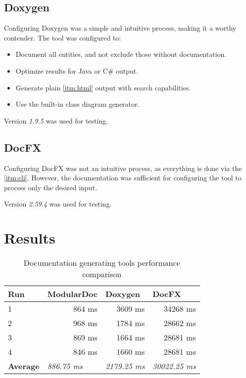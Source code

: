 \subsection{Doxygen}

Configuring Doxygen was a simple and intuitive process, making it a worthy contender. The tool was configured to:
\begin{itemize}
    \item Document all entities, and not exclude those without documentation.
    \item Optimize results for Java or C\# output.
    \item Generate plain \ref{itm:html} output with search capabilities.
    \item Use the built-in class diagram generator.
\end{itemize}

Version \textit{1.9.5} was used for testing.

\subsection{DocFX}

Configuring DocFX was not an intuitive process, as everything is done via the \ref{itm:cli}. However, the documentation was sufficient for configuring the tool to process only the desired input.

Version \textit{2.59.4} was used for testing.

\section{Results}

\begin{table}[H]
    \centering
    \label{tab:toolPerformance}
    \begin{tabular}{lrrr}
    \hline
    \textbf{Run}            & \multicolumn{1}{l}{\textbf{ModularDoc}}    & \multicolumn{1}{l}{\textbf{Doxygen}}    & \multicolumn{1}{l}{\textbf{DocFX}}       \\ \hline
    \multicolumn{1}{|l|}{1} & \multicolumn{1}{r|}{864 ms}            & \multicolumn{1}{r|}{3609 ms}            & \multicolumn{1}{r|}{34268 ms}            \\ \hline
    \multicolumn{1}{|l|}{2} & \multicolumn{1}{r|}{968 ms}            & \multicolumn{1}{r|}{1784 ms}            & \multicolumn{1}{r|}{28662 ms}            \\ \hline
    \multicolumn{1}{|l|}{3} & \multicolumn{1}{r|}{869 ms}            & \multicolumn{1}{r|}{1664 ms}            & \multicolumn{1}{r|}{28681 ms}            \\ \hline
    \multicolumn{1}{|l|}{4} & \multicolumn{1}{r|}{846 ms}            & \multicolumn{1}{r|}{1660 ms}            & \multicolumn{1}{r|}{28681 ms}            \\ \hline
    \textbf{Average}        & \multicolumn{1}{l}{\textit{886.75 ms}} & \multicolumn{1}{l}{\textit{2179.25 ms}} & \multicolumn{1}{l}{\textit{30022.25 ms}} \\ \hline
    \end{tabular}
    \caption{Documentation generating tools performance comparison}
\end{table}

